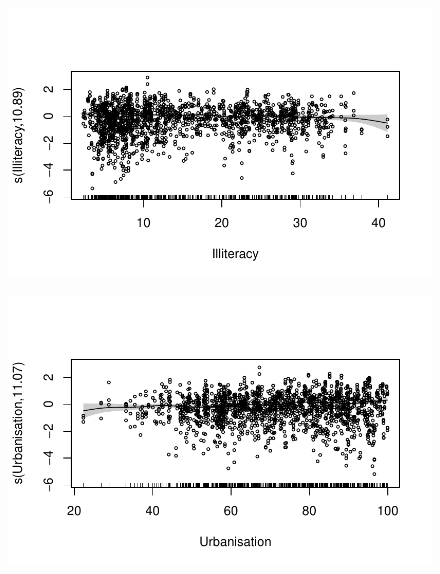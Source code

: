 \documentclass[
  letterpaper,
  DIV=11,
  numbers=noendperiod]{scrartcl}
\begin{document}
\begin{figure}[H]

{\centering \includegraphics{Group34Coursework_files/figure-pdf/unnamed-chunk-18-2.pdf}

}

\end{figure}

\begin{figure}[H]

{\centering \includegraphics{Group34Coursework_files/figure-pdf/unnamed-chunk-18-3.pdf}

}

\end{figure}
\end{document}
